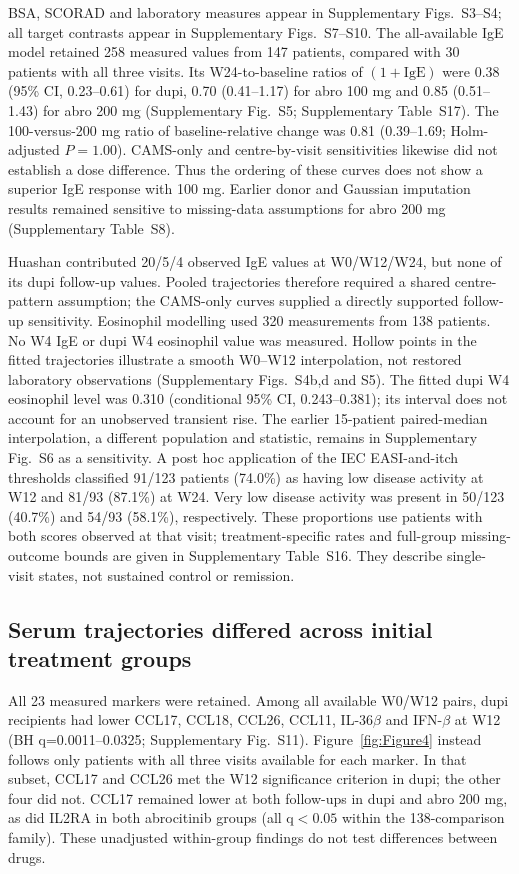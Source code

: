 \documentclass[10pt,a4paper]{article}
\begin{document}
BSA, SCORAD and laboratory measures appear in Supplementary Figs.~S3--S4; all target contrasts appear in Supplementary Figs.~S7--S10. The all-available IgE model retained 258 measured values from 147 patients, compared with 30 patients with all three visits. Its W24-to-baseline ratios of $(1+\mathrm{IgE})$ were 0.38 (95\% CI, 0.23--0.61) for dupi, 0.70 (0.41--1.17) for abro 100 mg and 0.85 (0.51--1.43) for abro 200 mg (Supplementary Fig.~S5; Supplementary Table~S17). The 100-versus-200 mg ratio of baseline-relative change was 0.81 (0.39--1.69; Holm-adjusted $P=1.00$). CAMS-only and centre-by-visit sensitivities likewise did not establish a dose difference. Thus the ordering of these curves does not show a superior IgE response with 100 mg. Earlier donor and Gaussian imputation results remained sensitive to missing-data assumptions for abro 200 mg (Supplementary Table~S8).

Huashan contributed 20/5/4 observed IgE values at W0/W12/W24, but none of its dupi follow-up values. Pooled trajectories therefore required a shared centre-pattern assumption; the CAMS-only curves supplied a directly supported follow-up sensitivity. Eosinophil modelling used 320 measurements from 138 patients. No W4 IgE or dupi W4 eosinophil value was measured. Hollow points in the fitted trajectories illustrate a smooth W0--W12 interpolation, not restored laboratory observations (Supplementary Figs.~S4b,d and S5). The fitted dupi W4 eosinophil level was 0.310 (conditional 95\% CI, 0.243--0.381); its interval does not account for an unobserved transient rise. The earlier 15-patient paired-median interpolation, a different population and statistic, remains in Supplementary Fig.~S6 as a sensitivity.
A post hoc application of the IEC EASI-and-itch thresholds classified 91/123 patients (74.0\%) as having low disease activity at W12 and 81/93 (87.1\%) at W24. Very low disease activity was present in 50/123 (40.7\%) and 54/93 (58.1\%), respectively. These proportions use patients with both scores observed at that visit; treatment-specific rates and full-group missing-outcome bounds are given in Supplementary Table~S16. They describe single-visit states, not sustained control or remission.

\subsection{Serum trajectories differed across initial treatment groups}
All 23 measured markers were retained. Among all available W0/W12 pairs, dupi recipients had lower CCL17, CCL18, CCL26, CCL11, IL-36$\beta$ and IFN-$\beta$ at W12 (BH q=0.0011--0.0325; Supplementary Fig.~S11). Figure~\ref{fig:Figure4} instead follows only patients with all three visits available for each marker. In that subset, CCL17 and CCL26 met the W12 significance criterion in dupi; the other four did not. CCL17 remained lower at both follow-ups in dupi and abro 200 mg, as did IL2RA in both abrocitinib groups (all q$<0.05$ within the 138-comparison family). These unadjusted within-group findings do not test differences between drugs.
\end{document}
